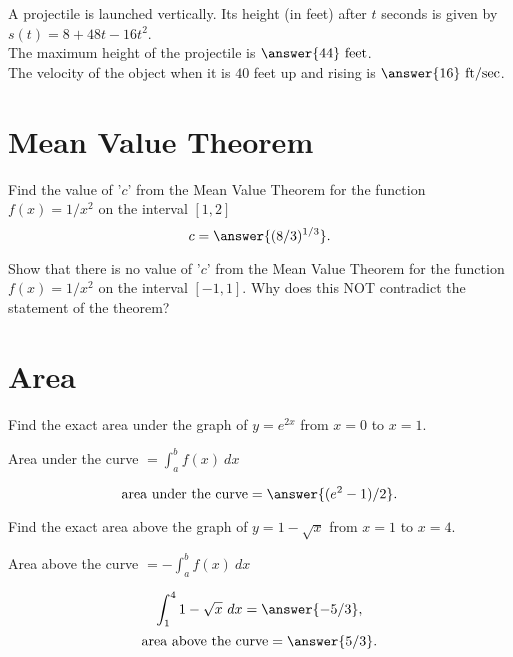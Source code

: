 \documentclass{ximera}
\begin{document}
\begin{problem}
A projectile is launched vertically.  Its height (in feet) after $t$ seconds is given by
$s(t) = 8 + 48t -16t^2$.\\

The maximum height of the projectile is $\answer{44} \ \text{feet}$.\\
The velocity of the object when it is $40$ feet up and rising is $\answer{16} \ \text{ft/sec}$.
\end{problem}


\section{Mean Value Theorem}

\begin{problem}
Find the value of '$c$' from the Mean Value Theorem for the function $f(x) = 1/x^2$ on the interval 
$[1,2]$
\[c=\answer{(8/3)^{1/3}}.\]
\end{problem}

\begin{problem}
Show that there is no value of '$c$' from the Mean Value Theorem for the function 
$f(x) = 1/x^2$ on the interval $[-1, 1]$.  Why does this NOT contradict the statement of the theorem?
\end{problem}

\section{Area}


\begin{problem}
Find the exact area under the graph of $y = e^{2x}$ from $x = 0$ to $x = 1$. \\
\begin{hint}
Area under the curve $= \int_a^b f(x) \ dx$
\end{hint}

\[\text{area under the curve} = \answer{(e^2 -1)/2}.\]
\end{problem}


\begin{problem}
Find the exact area above the graph of $y = 1 - \sqrt x$ from $x = 1$ to $x = 4$. \\
\begin{hint}
Area above the curve $= -\int_a^b f(x) \ dx$
\end{hint}
\[\int_1^4 1 - \sqrt x \ dx = \answer{-5/3},\]
\[\text{area above the curve} = \answer{5/3}.\]
\end{problem}
\end{document}
